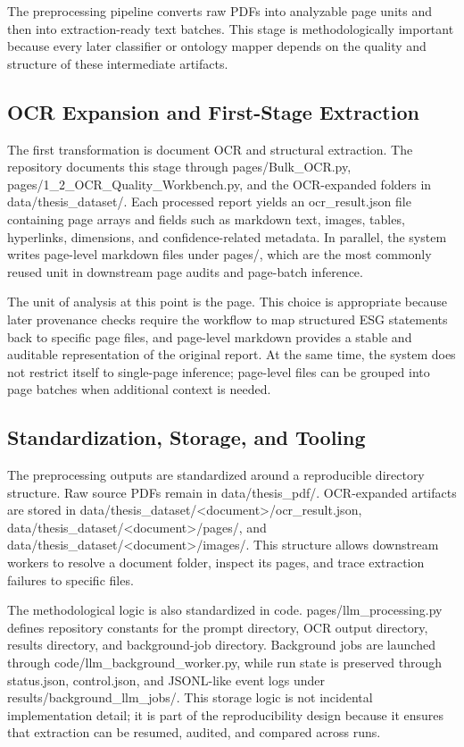 The preprocessing pipeline converts raw PDFs into analyzable page units and then into extraction-ready text batches. This stage is methodologically important because every later classifier or ontology mapper depends on the quality and structure of these intermediate artifacts.

\subsection{OCR Expansion and First-Stage Extraction}

The first transformation is document OCR and structural extraction. The repository documents this stage through pages/Bulk\_OCR.py, pages/1\_2\_OCR\_Quality\_Workbench.py, and the OCR-expanded folders in data/thesis\_dataset/. Each processed report yields an ocr\_result.json file containing page arrays and fields such as markdown text, images, tables, hyperlinks, dimensions, and confidence-related metadata. In parallel, the system writes page-level markdown files under pages/, which are the most commonly reused unit in downstream page audits and page-batch inference.

The unit of analysis at this point is the page. This choice is appropriate because later provenance checks require the workflow to map structured ESG statements back to specific page files, and page-level markdown provides a stable and auditable representation of the original report. At the same time, the system does not restrict itself to single-page inference; page-level files can be grouped into page batches when additional context is needed.

\subsection{Standardization, Storage, and Tooling}

The preprocessing outputs are standardized around a reproducible directory structure. Raw source PDFs remain in data/thesis\_pdf/. OCR-expanded artifacts are stored in data/thesis\_dataset/<document>/ocr\_result.json, data/thesis\_dataset/<document>/pages/, and data/thesis\_dataset/<document>/images/. This structure allows downstream workers to resolve a document folder, inspect its pages, and trace extraction failures to specific files.

The methodological logic is also standardized in code. pages/llm\_processing.py defines repository constants for the prompt directory, OCR output directory, results directory, and background-job directory. Background jobs are launched through code/llm\_background\_worker.py, while run state is preserved through status.json, control.json, and JSONL-like event logs under results/background\_llm\_jobs/. This storage logic is not incidental implementation detail; it is part of the reproducibility design because it ensures that extraction can be resumed, audited, and compared across runs.

